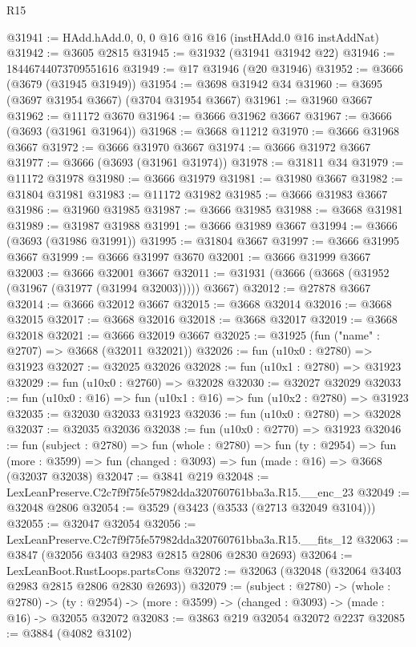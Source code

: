 \begin{lexlean}{R15}
\begin{coremodule}
@31941 := HAdd.hAdd.{0, 0, 0} @16 @16 @16 (instHAdd.{0} @16 instAddNat)
@31942 := @3605 @2815
@31945 := @31932 (@31941 @31942 @22)
@31946 := 18446744073709551616
@31949 := @17 @31946 (@20 @31946)
@31952 := @3666 (@3679 (@31945 @31949))
@31954 := @3698 @31942 @34
@31960 := @3695 (@3697 @31954 @3667) (@3704 @31954 @3667)
@31961 := @31960 @3667
@31962 := @11172 @3670
@31964 := @3666 @31962 @3667
@31967 := @3666 (@3693 (@31961 @31964))
@31968 := @3668 @11212
@31970 := @3666 @31968 @3667
@31972 := @3666 @31970 @3667
@31974 := @3666 @31972 @3667
@31977 := @3666 (@3693 (@31961 @31974))
@31978 := @31811 @34
@31979 := @11172 @31978
@31980 := @3666 @31979
@31981 := @31980 @3667
@31982 := @31804 @31981
@31983 := @11172 @31982
@31985 := @3666 @31983 @3667
@31986 := @31960 @31985
@31987 := @3666 @31985
@31988 := @3668 @31981
@31989 := @31987 @31988
@31991 := @3666 @31989 @3667
@31994 := @3666 (@3693 (@31986 @31991))
@31995 := @31804 @3667
@31997 := @3666 @31995 @3667
@31999 := @3666 @31997 @3670
@32001 := @3666 @31999 @3667
@32003 := @3666 @32001 @3667
@32011 := @31931 (@3666 (@3668 (@31952 (@31967 (@31977 (@31994 @32003))))) @3667)
@32012 := @27878 @3667
@32014 := @3666 @32012 @3667
@32015 := @3668 @32014
@32016 := @3668 @32015
@32017 := @3668 @32016
@32018 := @3668 @32017
@32019 := @3668 @32018
@32021 := @3666 @32019 @3667
@32025 := @31925 (fun ("name" : @2707) => @3668 (@32011 @32021))
@32026 := fun (u10x0 : @2780) => @31923
@32027 := @32025 @32026
@32028 := fun (u10x1 : @2780) => @31923
@32029 := fun (u10x0 : @2760) => @32028
@32030 := @32027 @32029
@32033 := fun (u10x0 : @16) => fun (u10x1 : @16) => fun (u10x2 : @2780) => @31923
@32035 := @32030 @32033 @31923
@32036 := fun (u10x0 : @2780) => @32028
@32037 := @32035 @32036
@32038 := fun (u10x0 : @2770) => @31923
@32046 := fun (subject : @2780) =>
  fun (whole : @2780) =>
  fun (ty : @2954) =>
  fun (more : @3599) => fun (changed : @3093) => fun (made : @16) => @3668 (@32037 @32038)
@32047 := @3841 @219
@32048 := LexLeanPreserve.C2c7f9f75fe57982dda320760761bba3a.R15.__enc_23
@32049 := @32048 @2806
@32054 := @3529 (@3423 (@3533 (@2713 @32049 @3104)))
@32055 := @32047 @32054
@32056 := LexLeanPreserve.C2c7f9f75fe57982dda320760761bba3a.R15.__fits_12
@32063 := @3847 (@32056 @3403 @2983 @2815 @2806 @2830 @2693)
@32064 := LexLeanBoot.RustLoops.partsCons
@32072 := @32063 (@32048 (@32064 @3403 @2983 @2815 @2806 @2830 @2693))
@32079 := (subject : @2780) ->
  (whole : @2780) ->
  (ty : @2954) -> (more : @3599) -> (changed : @3093) -> (made : @16) -> @32055 @32072
@32083 := @3863 @219 @32054 @32072 @2237
@32085 := @3884 (@4082 @3102)

\end{coremodule}
\end{lexlean}
